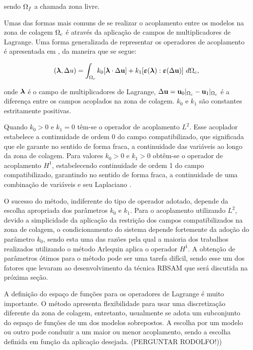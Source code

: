 \documentclass[tese_patricia]{subfiles}
\begin{document}
\noindent sendo  $\Omega_f$ a chamada zona livre.

Umas das formas mais comuns de se realizar o acoplamento entre os modelos na zona de colagem $\Omega_c$ é através da aplicação de campos de multiplicadores de Lagrange. Uma forma generalizada de representar os operadores de acoplamento é apresentada em , da maneira que se segue:

\begin{align}
	(\boldsymbol{\lambda},\Delta u) =  \int_{\Omega_c} k_{0}[\boldsymbol{\lambda} \cdot \Delta \mathbf{u} ] + k_{1}[\bm{\varepsilon} (\boldsymbol{\lambda}) : \bm{\varepsilon} (\Delta \mathbf{u})] \ d\Omega_{c},
\end{align}

\noindent onde $\boldsymbol{\lambda}$ é o campo de multiplicadores de Lagrange, $\Delta \mathbf{u} = \mathbf{u}_0 |_{\Omega_c} - \mathbf{u}_1 |_{\Omega_c}$ é a diferença entre os campos acoplados na zona de colagem. $k_{0}$ e $k_{1}$ são constantes estritamente positivas. 

Quando $k_{0} > 0$ e $k_{1} = 0 $ têm-se o operador de acoplamento $L^{2}$. Esse acoplador estabelece a continuidade de ordem 0 do campo compatibilizado, que significada que ele garante no sentido de forma fraca, a continuidade das variáveis ao longo da zona de colagem. Para valores $k_{0} > 0$ e $k_{1} > 0 $ obtêm-se o operador de acoplamento $H^{1}$, estabelecendo continuidade de ordem 1 do campo compatibilizado, garantindo no sentido de forma fraca, a continuidade de uma combinação de variáveis e seu Laplaciano \cite{GuidaultAndBelytschko2007}.

O sucesso do método, indiferente do tipo de operador adotado, depende da escolha apropriada dos parâmetros $k_{0}$ e $k_{1}$. Para o acoplamento utilizando $L^{2}$, devido a simplicidade da aplicação da restrição dos campos compatibilizados na zona de colagem, o condicionamento do sistema depende fortemente da adoção do parâmetro $k_{0}$, sendo esta uma das razões pela qual a maioria dos trabalhos realizados utilizando o método Arlequin aplica o operador $H^{1}$. A obtenção de parâmetros ótimos para o método pode ser uma tarefa difícil, sendo esse um dos fatores que levaram  ao desenvolvimento da técnica RBSAM que será discutida na próxima seção.

A definição do espaço de funções para os operadores de Lagrange é muito importante. O método apresenta flexibilidade para usar uma discretização diferente da zona de colagem, entretanto, usualmente se adota um subconjunto do espaço de funções de um dos modelos sobrepostos. A escolha por um modelo ou outro pode conduzir a um maior ou menor acoplamento, sendo a escolha definida em função da aplicação desejada. (PERGUNTAR RODOLFO!))  
\end{document}
